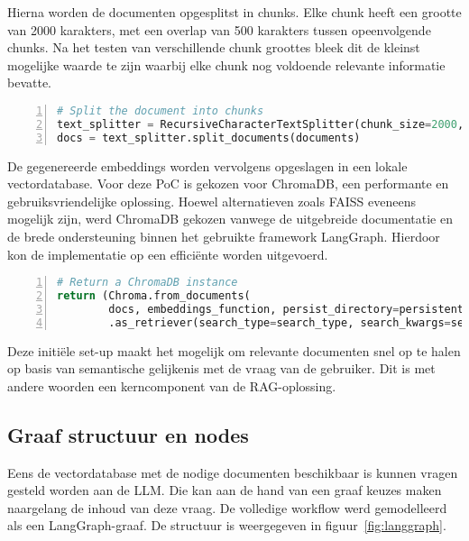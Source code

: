 Hierna worden de documenten opgesplitst in chunks. Elke chunk heeft een grootte van 2000 karakters, met een overlap van 500 karakters tussen opeenvolgende chunks. Na het testen van verschillende chunk groottes bleek dit de kleinst mogelijke waarde te zijn waarbij elke chunk nog voldoende relevante informatie bevatte.

\begin{lstlisting}[basicstyle=\small, frame=single, breaklines=true, postbreak=\mbox{\textcolor{red}{$\hookrightarrow$}\space}, escapeinside ={\%,}, escapechar={!}, numbers=left, language=Python, caption=Definiëren van tekstsplitter] 
# Split the document into chunks
text_splitter = RecursiveCharacterTextSplitter(chunk_size=2000, chunk_overlap=500)
docs = text_splitter.split_documents(documents)
\end{lstlisting}

De gegenereerde embeddings worden vervolgens opgeslagen in een lokale vectordatabase. Voor deze PoC is gekozen voor ChromaDB, een performante en gebruiksvriendelijke oplossing. Hoewel alternatieven zoals FAISS eveneens mogelijk zijn, werd ChromaDB gekozen vanwege de uitgebreide documentatie en de brede ondersteuning binnen het gebruikte framework LangGraph. Hierdoor kon de implementatie op een efficiënte worden uitgevoerd.

\begin{lstlisting}[basicstyle=\small, frame=single, breaklines=true, postbreak=\mbox{\textcolor{red}{$\hookrightarrow$}\space}, escapeinside ={\%,}, escapechar={!}, numbers=left, language=Python, caption=Aanmaken ChromaDB instantie]
# Return a ChromaDB instance
return (Chroma.from_documents(
        docs, embeddings_function, persist_directory=persistent_directory)
        .as_retriever(search_type=search_type, search_kwargs=search_kwargs))
\end{lstlisting}

Deze initiële set-up maakt het mogelijk om relevante documenten snel op te halen op basis van semantische gelijkenis met de vraag van de gebruiker. Dit is met andere woorden een kerncomponent van de RAG-oplossing.

\subsection{Graaf structuur en nodes}

Eens de vectordatabase met de nodige documenten beschikbaar is kunnen vragen gesteld worden aan de LLM. Die kan aan de hand van een graaf keuzes maken naargelang de inhoud van deze vraag. De volledige workflow werd gemodelleerd als een LangGraph-graaf. De structuur is weergegeven in figuur~\ref{fig:langgraph}.

